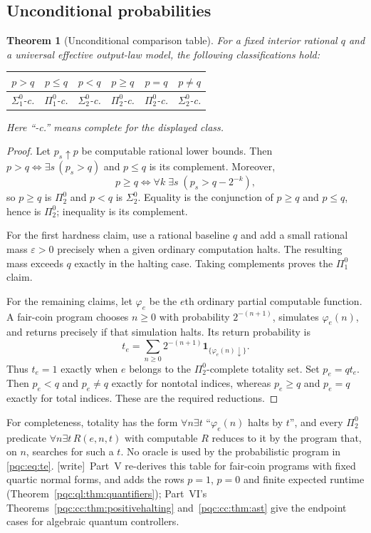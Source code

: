 \documentclass[11pt,letterpaper]{article}
\numberwithin{equation}{section}
\newtheorem{theorem}{Theorem}[section]
\theoremstyle{definition}
\theoremstyle{remark}
\newcommand{\wtag}{\textup{[write]}}
\newcommand{\indic}[1]{\mathbf 1_{\{#1\}}}
\newcommand{\sigone}{\Sigma^0_1}
\newcommand{\pione}{\Pi^0_1}
\newcommand{\sigtwo}{\Sigma^0_2}
\newcommand{\pitwo}{\Pi^0_2}
\begin{document}
\subsection{Unconditional probabilities}
\begin{theorem}[Unconditional comparison table]\label{pqc:thm:unconditionaltable}
For a fixed interior rational $q$ and a universal effective output-law model,
the following classifications hold:
\begin{center}
\begin{tabular}{cccccc}
\toprule
$p>q$ & $p\le q$ & $p<q$ & $p\ge q$ & $p=q$ & $p\ne q$\\
\midrule
$\sigone$-c. & $\pione$-c. & $\sigtwo$-c. & $\pitwo$-c. & $\pitwo$-c. & $\sigtwo$-c.\\
\bottomrule
\end{tabular}
\end{center}
Here ``-c.'' means complete for the displayed class.
\end{theorem}
\begin{proof}
Let $p_s\uparrow p$ be computable rational lower bounds. Then
$p>q\iff\exists s\,(p_s>q)$ and $p\le q$ is its complement. Moreover,
\[
 p\ge q\iff\forall k\;\exists s\;(p_s>q-2^{-k}),
\]
so $p\ge q$ is $\pitwo$ and $p<q$ is $\sigtwo$. Equality is the conjunction
of $p\ge q$ and $p\le q$, hence is $\pitwo$; inequality is its complement.

For the first hardness claim, use a rational baseline $q$ and add a small
rational mass $\varepsilon>0$ precisely when a given ordinary computation
halts. The resulting mass exceeds $q$ exactly in the halting case.
Taking complements proves the $\pione$ claim.

For the remaining claims, let $\varphi_e$ be the $e$th ordinary partial
computable function. A fair-coin program chooses $n\ge0$ with probability
$2^{-(n+1)}$, simulates $\varphi_e(n)$, and returns precisely if that
simulation halts. Its return probability is
\begin{equation}\label{pqc:eq:te}
 t_e=\sum_{n\ge0}2^{-(n+1)}\indic{\varphi_e(n)\downarrow}.
\end{equation}
Thus $t_e=1$ exactly when $e$ belongs to the $\pitwo$-complete totality set.
Set $p_e=qt_e$. Then $p_e<q$ and $p_e\ne q$ exactly for nontotal indices,
whereas $p_e\ge q$ and $p_e=q$ exactly for total indices. These are the
required reductions.
\end{proof}

For completeness, totality has the form
$\forall n\exists t$ ``$\varphi_e(n)$ halts by $t$'', and every
$\pitwo$ predicate $\forall n\exists t\,R(e,n,t)$ with computable $R$
reduces to it by the program that, on $n$, searches for such a $t$.
No oracle is used by the probabilistic program in \eqref{pqc:eq:te}.
\wtag\ Part~V re-derives this table for fair-coin programs with fixed quartic
normal forms, and adds the rows $p=1$, $p=0$ and finite expected runtime
(Theorem~\ref{pqc:ql:thm:quantifiers}); Part~VI's
Theorems~\ref{pqc:cc:thm:positivehalting} and~\ref{pqc:cc:thm:ast} give the
endpoint cases for algebraic quantum controllers.
\end{document}

